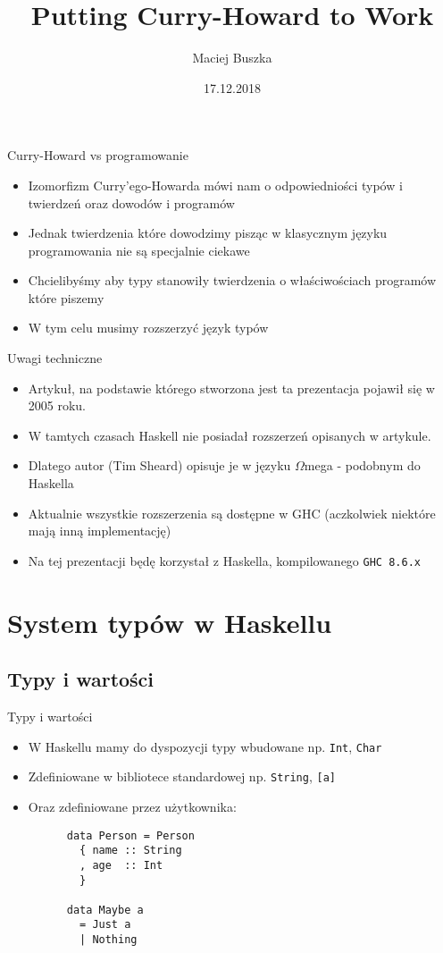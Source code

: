 \documentclass{beamer}
\title[Putting Curry-Howard to Work]{Putting Curry-Howard to Work}
\author{Maciej Buszka}
\institute{Instytut Informatyki UWr}
\date{17.12.2018}
\begin{document}
\begin{frame}
	\titlepage
\end{frame}


\begin{frame}{Curry-Howard vs programowanie}
  \begin{itemize}
    \item Izomorfizm Curry'ego-Howarda mówi nam o odpowiedniości typów i twierdzeń oraz dowodów i programów
    \item Jednak twierdzenia które dowodzimy pisząc w klasycznym języku programowania nie są specjalnie ciekawe
    \item Chcielibyśmy aby typy stanowiły twierdzenia o właściwościach programów które piszemy
    \item W tym celu musimy rozszerzyć język typów
  \end{itemize}
\end{frame}


\begin{frame}{Uwagi techniczne}
  \begin{itemize}
    \item Artykuł, na podstawie którego stworzona jest ta prezentacja pojawił się w 2005 roku.
    \item W tamtych czasach Haskell nie posiadał rozszerzeń opisanych w artykule.
    \item Dlatego autor (Tim Sheard) opisuje je w języku $\Omega$mega - podobnym do Haskella
    \item Aktualnie wszystkie rozszerzenia są dostępne w GHC (aczkolwiek niektóre mają inną implementację)
    \item Na tej prezentacji będę korzystał z Haskella, kompilowanego \texttt{GHC 8.6.x}
  \end{itemize}
\end{frame}


\section{System typów w Haskellu}
\subsection{Typy i wartości}
\begin{frame}[fragile]{Typy i wartości}
  \begin{itemize}
    \item W Haskellu mamy do dyspozycji typy wbudowane np. \lstinline!Int!, \lstinline!Char!
    \item Zdefiniowane w bibliotece standardowej np. \lstinline!String!, \lstinline![a]!
    \item Oraz zdefiniowane przez użytkownika:\\ \begin{lstlisting}
      data Person = Person 
        { name :: String
        , age  :: Int
        }
  
      data Maybe a 
        = Just a
        | Nothing
    \end{lstlisting}
  \end{itemize}
\end{frame}
\end{document}

